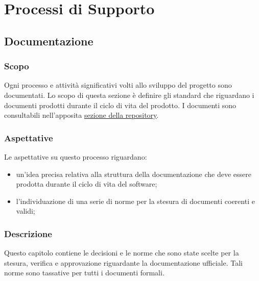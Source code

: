 \section{Processi di Supporto}
	\subsection{Documentazione}
		\subsubsection{Scopo}
		Ogni processo e attività significativi volti allo sviluppo del progetto sono documentati. Lo scopo di questa sezione è definire gli standard che riguardano i documenti prodotti durante il ciclo di vita del prodotto.
		I documenti sono consultabili nell'apposita \href{https://github.com/8LabSolutions/Soldino}{\underline{sezione della repository}}. 		
		\subsubsection{Aspettative}
		Le aspettative su questo processo riguardano:
		\begin{itemize}
			\item un'idea precisa relativa alla struttura della documentazione che deve essere prodotta durante il ciclo di vita del software;
			\item l'individuazione di una serie di norme per la stesura di documenti coerenti e validi;
		\end{itemize}
		\subsubsection{Descrizione}
		Questo capitolo contiene le decisioni e le norme che sono state scelte per la
		stesura, verifica e approvazione riguardante la documentazione ufficiale.  Tali norme  sono  tassative  per  tutti  i  documenti  formali.
